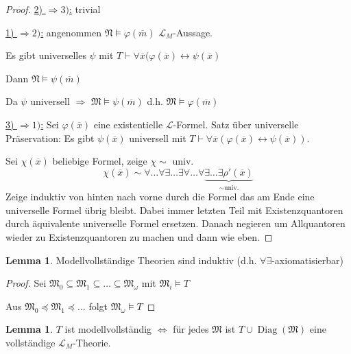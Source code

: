 \documentclass[12pt,parskip=full]{scrartcl}
\newcommand{\heading}{\underline}
\theoremstyle{definition}
\newtheorem{lemma}[theorem]{Lemma}
\begin{document}
	\begin{proof}
		\heading{2) $\Rightarrow 3)$:} trivial
		
		\heading{1) $\Rightarrow 2)$:} angenommen $\mathfrak{N} \models \varphi(\overline{m})$ $\mathcal{L}_M$-Aussage.
		
		Es gibt universelles $\psi$ mit $T \vdash \forall \overline{x} (\varphi(\overline{x}) \leftrightarrow \psi(\overline{x})$
		
		Dann $\mathfrak{N} \models \psi(\overline{m})$
		
		Da $\psi$ universell $\Rightarrow$ $\mathfrak{M} \models \psi(\overline{m})$ d.h. $\mathfrak{M} \models \varphi(\overline{m})$
		
		\heading{3) $\Rightarrow 1)$:} Sei $\varphi(\overline{x})$ eine existentielle $\mathcal{L}$-Formel. Satz über universelle Präservation: Es gibt $\psi(\overline{x})$ universell mit $T \vdash \forall \overline{x}(\varphi(\overline{x}) \leftrightarrow \psi(\overline{x}))$.
		
		Sei $\chi(\overline{x})$ beliebige Formel, zeige $\chi \sim $ univ.
		\begin{equation*}
			\chi(\overline{x}) \sim \forall \dots \forall \exists \dots \exists \forall \dots \forall \underbrace{\exists \dots \exists \rho'(\overline{x})}_{\sim \text{univ.}}
		\end{equation*}
		Zeige induktiv von hinten nach vorne durch die Formel das am Ende eine universelle Formel übrig bleibt. Dabei immer letzten Teil mit Existenzquantoren durch äquivalente universelle Formel ersetzen. Danach negieren um Allquantoren wieder zu Existenzquantoren zu machen und dann wie eben.
	\end{proof}

	\begin{lemma}
		Modellvollständige Theorien sind induktiv (d.h. $\forall\exists$-axiomatisierbar)
	\end{lemma}

	\begin{proof}
		Sei $\mathfrak{M}_0 \subseteq \mathfrak{M}_1 \subseteq \dots \subseteq \mathfrak{M}_\omega$ mit $\mathfrak{M}_i \models T$
		
		Aus $\mathfrak{M}_0 \preccurlyeq \mathfrak{M}_1 \preccurlyeq \dots$ folgt $\mathfrak{M}_\omega \models T$
	\end{proof}

	\begin{lemma}
		$T$ ist modellvollständig $\Leftrightarrow$ für jedes $\mathfrak{M}$ ist $T \cup \operatorname{Diag}(\mathfrak{M})$ eine vollständige $\mathcal{L}_M$-Theorie.
	\end{lemma}
\end{document}
